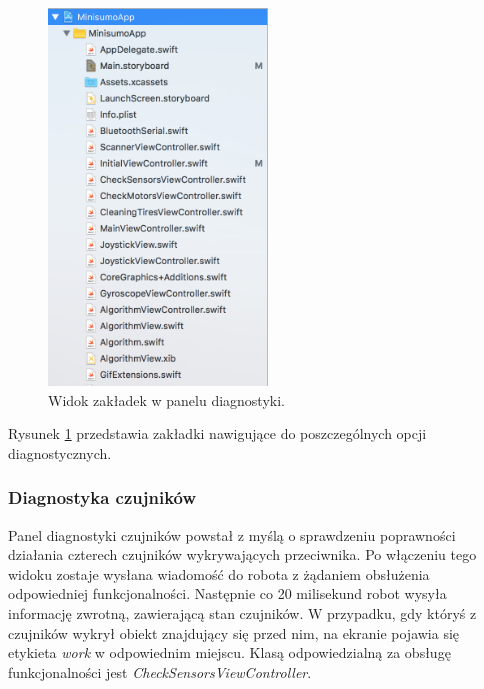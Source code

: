 \begin{figure}[H]
	\centering
		\includegraphics[width=0.75\linewidth, height=10cm, keepaspectratio]{pic05/structure.png}
	\caption{Widok zakładek w panelu diagnostyki.}
	\label{fig:pitstopview}	
\end{figure}

Rysunek \ref{fig:pitstopview} przedstawia zakładki nawigujące do poszczególnych opcji diagnostycznych.

\newpage

\subsubsection{Diagnostyka czujników}
Panel diagnostyki czujników powstał z myślą o sprawdzeniu poprawności działania czterech czujników wykrywających przeciwnika. Po włączeniu tego widoku zostaje wysłana wiadomość do robota z żądaniem obsłużenia odpowiedniej funkcjonalności. Następnie co 20 milisekund robot wysyła informację zwrotną, zawierającą stan czujników. W przypadku, gdy któryś z czujników wykrył obiekt znajdujący się przed nim, na ekranie pojawia się etykieta \textit{work} w odpowiednim miejscu. Klasą odpowiedzialną za obsługę funkcjonalności jest \textit{CheckSensorsViewController}.

